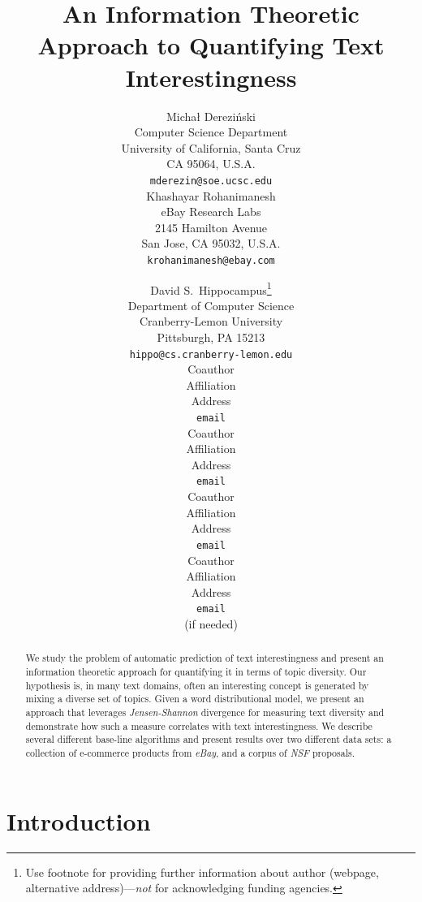 \documentclass{article} %
\title{An Information Theoretic Approach to Quantifying Text Interestingness}
\author{
Micha{\l } Derezi\'{n}ski\\
Computer Science Department\\
University of California, Santa Cruz\\
CA 95064, U.S.A.\\
\texttt{mderezin@soe.ucsc.edu}\\
\And
Khashayar Rohanimanesh\\
eBay Research Labs\\
2145 Hamilton Avenue\\
San Jose, CA 95032, U.S.A.\\
\texttt{krohanimanesh@ebay.com}\\
}
\author{
David S.~Hippocampus\thanks{ Use footnote for providing further information
about author (webpage, alternative address)---\emph{not} for acknowledging
funding agencies.} \\
Department of Computer Science\\
Cranberry-Lemon University\\
Pittsburgh, PA 15213 \\
\texttt{hippo@cs.cranberry-lemon.edu} \\
\And
Coauthor \\
Affiliation \\
Address \\
\texttt{email} \\
\AND
Coauthor \\
Affiliation \\
Address \\
\texttt{email} \\
\And
Coauthor \\
Affiliation \\
Address \\
\texttt{email} \\
\And
Coauthor \\
Affiliation \\
Address \\
\texttt{email} \\
(if needed)\\
}
\begin{document}
\maketitle

\begin{abstract}

We study the problem of automatic prediction of text interestingness and present an information theoretic approach for
quantifying it in terms of topic diversity. Our hypothesis is, in many text domains, often an interesting
concept is generated by mixing a diverse set of topics. Given a word distributional model, we present
an approach that leverages {\sl Jensen-Shannon} divergence for measuring text diversity and demonstrate how such a measure
correlates with text interestingness. We describe several different base-line algorithms and present results over two different
data sets: a collection of e-commerce products from {\sl eBay}, and a corpus of {\sl NSF} proposals.
\end{abstract}



\section{Introduction}
\label{sec:introduction}
\end{document}
